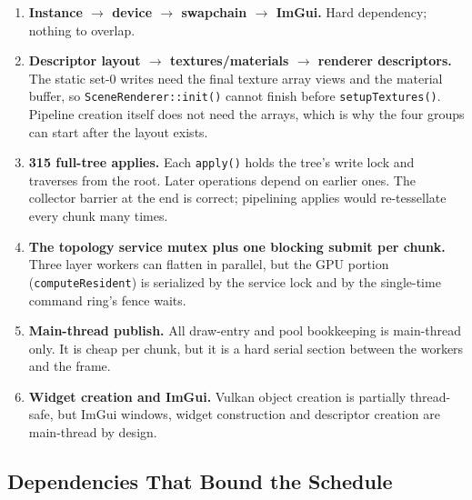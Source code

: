 \documentclass[11pt,a4paper]{article}
\begin{document}
\begin{enumerate}[leftmargin=1.5em,itemsep=3pt]
\item \textbf{Instance $\rightarrow$ device $\rightarrow$ swapchain
$\rightarrow$ ImGui.} Hard dependency; nothing to overlap.
\item \textbf{Descriptor layout $\rightarrow$ textures/materials
$\rightarrow$ renderer descriptors.} The static set-0 writes need the final
texture array views and the material buffer, so
\texttt{SceneRenderer::init()} cannot finish before \texttt{setupTextures()}.
Pipeline creation itself does not need the arrays, which is why the four
groups can start after the layout exists.
\item \textbf{315 full-tree applies.} Each \texttt{apply()} holds the tree's
write lock and traverses from the root. Later operations depend on earlier
ones. The collector barrier at the end is correct; pipelining applies would
re-tessellate every chunk many times.
\item \textbf{The topology service mutex plus one blocking submit per chunk.}
Three layer workers can flatten in parallel, but the GPU portion
(\texttt{computeResident}) is serialized by the service lock and by the
single-time command ring's fence waits.
\item \textbf{Main-thread publish.} All draw-entry and pool bookkeeping is
main-thread only. It is cheap per chunk, but it is a hard serial section
between the workers and the frame.
\item \textbf{Widget creation and ImGui.} Vulkan object creation is partially
thread-safe, but ImGui windows, widget construction and descriptor creation
are main-thread by design.
\end{enumerate}

\subsection{Dependencies That Bound the Schedule}
\end{document}
